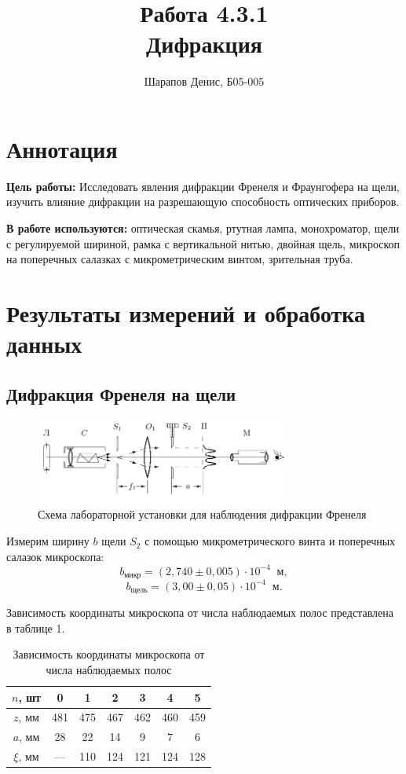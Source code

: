 \documentclass[a4paper]{article}
\title{Работа 4.3.1 \\ Дифракция}
\author{Шарапов Денис, Б05-005}
\date{}
\begin{document}
    \maketitle
    \tableofcontents
    \newpage
    
\section{Аннотация}

\noindent\textbf{Цель работы:} Исследовать явления дифракции Френеля и Фраунгофера на щели, изучить влияние дифракции на разрешающую способность оптических приборов. \smallskip
 
\noindent \textbf{В работе используются:} оптическая скамья, ртутная лампа, монохроматор, щели с регулируемой шириной, рамка с вертикальной нитью, двойная щель, микроскоп на поперечных салазках с микрометрическим винтом, зрительная труба.

\section{Результаты измерений и обработка данных}

\subsection{Дифракция Френеля на щели}

\begin{figure}[ht!]
    \centering
    \includegraphics[width = 0.75\textwidth]{image/pic1.png}
    \caption{Схема лабораторной установки для наблюдения дифракции Френеля}
\end{figure}

\noindent Измерим ширину $b$ щели $S_2$ с помощью микрометрического винта и поперечных салазок микроскопа: $$b_{\text{микр}} = (2,740 \pm 0,005) \cdot 10^{-4} \;\; \text{м},$$ $$b_{\text{щель}} = (3,00 \pm 0,05)\cdot 10^{-4} \;\; \text{м}.$$

\noindent Зависимость координаты микроскопа от числа наблюдаемых полос представлена в таблице 1.

\begin{table}[!ht]
    \centering
    \caption{Зависимость координаты микроскопа от числа наблюдаемых полос}
    \begin{tabular}{|c|c|c|c|c|c|c|}
    \hline
    $n$, шт    & 0   & 1   & 2   & 3   & 4   & 5   \\ \hline
    $z$, мм    & 481 & 475 & 467 & 462 & 460 & 459 \\ \hline
    $a$, мм    & 28  & 22  & 14  & 9   & 7   & 6   \\ \hline
    $\xi$, мм & --- & 110 & 124 & 121 & 124 & 128 \\ \hline
    \end{tabular}
\end{table}
\end{document}
